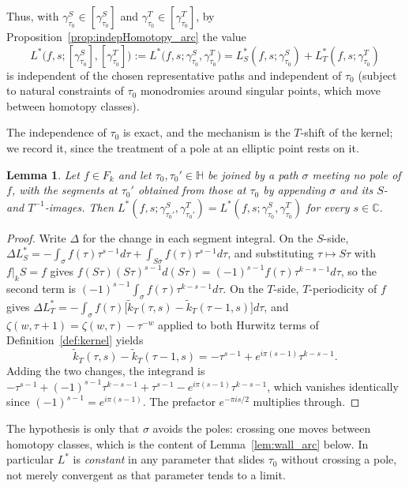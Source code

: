 \documentclass[11pt]{article}
\newtheorem{lemma}[theorem]{Lemma}
\newcommand{\HH}{\mathbb{H}}
\newcommand{\CC}{\mathbb{C}}
\newcommand{\tk}{\widetilde{k}_T}
\begin{document}
Thus, with $\gamma^S_{\tau_0} \in [\gamma^S_{\tau_0}]$ and
$\gamma^T_{\tau_0} \in [\gamma^T_{\tau_0}]$, by Proposition~\ref{prop:indepHomotopy_arc}
the value
\begin{equation}\label{eq:Lclass_arc}
L^*\big(f,s;[\gamma^S_{\tau_0}],[\gamma^T_{\tau_0}]\big)
:= L^*\big(f,s;\gamma^S_{\tau_0} , \gamma^T_{\tau_0}\big)
= L^*_S(f,s;\gamma^S_{\tau_0}) + L^*_T(f,s;\gamma^T_{\tau_0})
\end{equation}
is independent of the chosen representative paths and independent of $\tau_0$ (subject to
natural constraints of $\tau_0$ monodromies around singular points, which move between
homotopy classes).

The independence of $\tau_0$ is exact, and the mechanism is the $T$-shift of the kernel; we record
it, since the treatment of a pole at an elliptic point rests on it.

\begin{lemma}\label{lem:tau0indep}
Let $f\in F_k$ and let $\tau_0,\tau_0'\in\HH$ be joined by a path $\sigma$ meeting no pole of $f$,
with the segments at $\tau_0'$ obtained from those at $\tau_0$ by appending $\sigma$ and its
$S$- and $T^{-1}$-images. Then
$L^*(f,s;\gamma^S_{\tau_0'},\gamma^T_{\tau_0'})=L^*(f,s;\gamma^S_{\tau_0},\gamma^T_{\tau_0})$ for
every $s\in\CC$.
\end{lemma}

\begin{proof}
Write $\Delta$ for the change in each segment integral. On the $S$-side,
$\Delta L^*_S=-\int_\sigma f(\tau)\tau^{s-1}d\tau+\int_{S\sigma}f(\tau)\tau^{s-1}d\tau$, and
substituting $\tau\mapsto S\tau$ with $f|_kS=f$ gives
$f(S\tau)(S\tau)^{s-1}d(S\tau)=(-1)^{s-1}f(\tau)\tau^{k-s-1}d\tau$, so the second term is
$(-1)^{s-1}\int_\sigma f(\tau)\tau^{k-s-1}d\tau$. On the $T$-side, $T$-periodicity of $f$ gives
$\Delta L^*_T=-\int_\sigma f(\tau)\big[\tk(\tau,s)-\tk(\tau-1,s)\big]d\tau$, and
$\zeta(w,\tau+1)=\zeta(w,\tau)-\tau^{-w}$ applied to both Hurwitz terms of
Definition~\ref{def:kernel} yields
\begin{equation}\label{eq:ktilshift}
\tk(\tau,s)-\tk(\tau-1,s)=-\tau^{s-1}+e^{i\pi(s-1)}\tau^{k-s-1}.
\end{equation}
Adding the two changes, the integrand is
$-\tau^{s-1}+(-1)^{s-1}\tau^{k-s-1}+\tau^{s-1}-e^{i\pi(s-1)}\tau^{k-s-1}$, which vanishes
identically since $(-1)^{s-1}=e^{i\pi(s-1)}$. The prefactor $e^{-\pi is/2}$ multiplies through.
\end{proof}

The hypothesis is only that $\sigma$ avoids the poles: crossing one moves between homotopy
classes, which is the content of Lemma~\ref{lem:wall_arc} below. In particular $L^*$ is
\emph{constant} in any parameter that slides $\tau_0$ without crossing a pole, not merely
convergent as that parameter tends to a limit.
\end{document}
